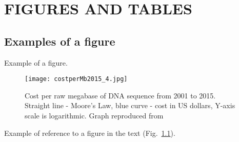 \chapter{FIGURES AND TABLES}
\section{Examples of a figure}

Example of a figure.
\begin{figure}[ht!]
\begin{center}
\texttt{[image: costperMb2015\_4.jpg]}
\end{center}
\caption[hehe]{Cost per raw megabase of DNA sequence from 2001 to 2015. Straight line - Moore's Law, blue curve - cost in US dollars, Y-axis scale is logarithmic. Graph reproduced from \citep{wetterstrand2016}}
\label{fig_dna_cost}
\end{figure}

Example of reference to a figure in the text (Fig.~\ref{fig_dna_cost}). \lipsum[3]


